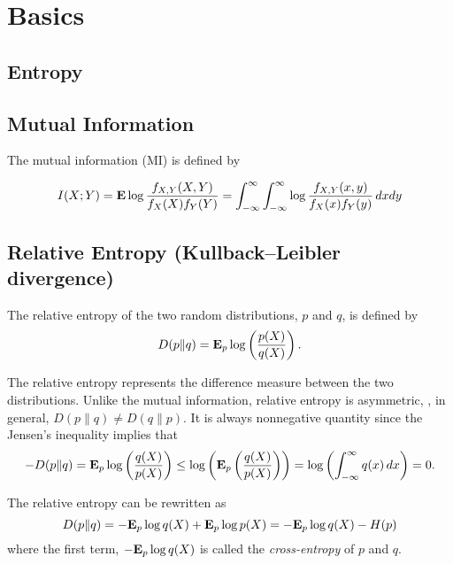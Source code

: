\section{Basics}

\subsection{Entropy}

\subsection{Mutual Information}

The mutual information (MI) is defined by

\begin{equation}
I(X;Y) = {\bf E{}} \log \frac{f_{X,Y}(X,Y)}{f_{X}(X)f_{Y}(Y)}
= \int_{-\infty}^{\infty} \int_{-\infty}^{\infty} \log \frac{f_{X,Y}(x,y)}{f_{X}(x)f_{Y}(y)} \, dx dy
\end{equation}


\subsection{Relative Entropy (Kullback–Leibler divergence)}

The relative entropy of the two random distributions, $p$ and $q$, is defined by
\begin{equation}
\label{eq:def-rel-ent}
D(p\|q) = {\bf E{}}_p \log\left(\frac{p(X)}{q(X)}\right).
\end{equation}

The relative entropy represents the difference measure between the two distributions.
Unlike the mutual information, relative entropy is asymmetric, \ie,
in general, $D(p\|q) \neq D(q\|p)$.
It is always nonnegative quantity since the Jensen's inequality implies that
\begin{equation}
-D(p\|q) = {\bf E{}}_p \log\left(\frac{q(X)}{p(X)}\right)
\leq \log\left({\bf E{}}_p \left(\frac{q(X)}{p(X)}\right)\right)
= \log\left(\int_{-\infty}^\infty q(x)\, dx \right) = 0.
\end{equation}

The relative entropy can be rewritten as
\begin{equation}
D(p\|q) = -{\bf E{}}_p \log q(X) + {\bf E{}}_p \log p(X)
= -{\bf E{}}_p \log q(X) - H(p)
\end{equation}
where the first term, $-{\bf E{}}_p \log q(X)$ is called the \emph{cross-entropy} of $p$ and $q$.


